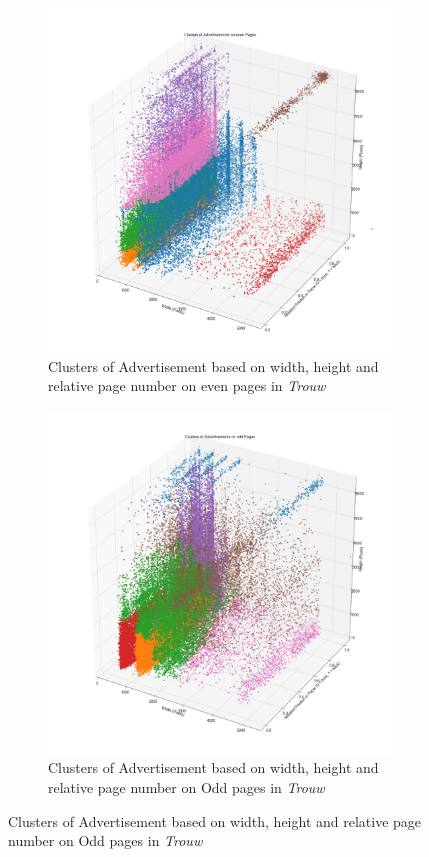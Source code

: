 \documentclass[USenglish]{article}
\begin{document}
\begin{figure}
  \centering
  \begin{subfigure}[b]{0.8\textwidth}
    \includegraphics[width=\textwidth]{figures/even_sizes}
    \caption{Clusters of Advertisement based on width, height and relative page number on even pages in \textit{Trouw}}
    \label{fig:clustera}
  \end{subfigure}
  \begin{subfigure}[b]{0.8\textwidth}
    \includegraphics[width=\textwidth]{figures/odd_sizes}
    \caption{Clusters of Advertisement based on width, height and relative page number on Odd pages in \textit{Trouw}}
    \label{fig:clusterb}
  \end{subfigure}
\end{figure}
\end{document}
